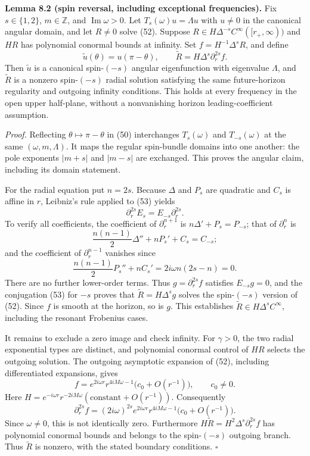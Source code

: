 \documentclass[
  10pt,
  a4paper,
]{article}
\begin{document}
\textbf{Lemma 8.2 (spin reversal, including exceptional frequencies).}
Fix \(s\in\{1,2\}\), \(m\in\mathbb Z\), and
\(\operatorname{Im}\omega>0\). Let \(T_s(\omega)u=\Lambda u\) with
\(u\ne0\) in the canonical angular domain, and let \(R\ne0\) solve (52).
Suppose \(R\in H\Delta^{-s}C^\infty([r_+,\infty))\) and \(HR\) has
polynomial conormal bounds at infinity. Set \(f=H^{-1}\Delta^sR\), and
define \[
 \widetilde u(\theta)=u(\pi-\theta),\qquad
 \widetilde R=H\Delta^s\partial_r^{2s}f.
 \tag{55}
\] Then \(\widetilde u\) is a canonical spin-\((-s)\) angular
eigenfunction with eigenvalue \(\Lambda\), and \(\widetilde R\) is a
nonzero spin-\((-s)\) radial solution satisfying the same future-horizon
regularity and outgoing infinity conditions. This holds at every
frequency in the open upper half-plane, without a nonvanishing horizon
leading-coefficient assumption.

\emph{Proof.} Reflecting \(\theta\mapsto\pi-\theta\) in (50)
interchanges \(T_s(\omega)\) and \(T_{-s}(\omega)\) at the same
\((\omega,m,\Lambda)\). It maps the regular spin-bundle domains into one
another: the pole exponents \(|m+s|\) and \(|m-s|\) are exchanged. This
proves the angular claim, including its domain statement.

For the radial equation put \(n=2s\). Because \(\Delta\) and \(P_s\) are
quadratic and \(C_s\) is affine in \(r\), Leibniz's rule applied to (53)
yields \[
 \boxed{\quad\partial_r^{2s}E_s
 = E_{-s}\partial_r^{2s}.\quad}
 \tag{56}
\] To verify all coefficients, the coefficient of \(\partial_r^{n+1}\)
is \(n\Delta'+P_s=P_{-s}\); that of \(\partial_r^n\) is \[
 \frac{n(n-1)}2\Delta''+nP_s'+C_s=C_{-s};
\] and the coefficient of \(\partial_r^{n-1}\) vanishes since \[
 \frac{n(n-1)}2P_s''+nC_s'
 =2i\omega n(2s-n)=0.
\] There are no further lower-order terms. Thus \(g=\partial_r^{2s}f\)
satisfies \(E_{-s}g=0\), and the conjugation (53) for \(-s\) proves that
\(\widetilde R=H\Delta^sg\) solves the spin-\((-s)\) version of (52).
Since \(f\) is smooth at the horizon, so is \(g\). This establishes
\(\widetilde R\in H\Delta^sC^\infty\), including the resonant Frobenius
cases.

It remains to exclude a zero image and check infinity. For \(\gamma>0\),
the two radial exponential types are distinct, and polynomial conormal
control of \(HR\) selects the outgoing solution. The outgoing asymptotic
expansion of (52), including differentiated expansions, gives \[
 f=e^{2i\omega r}r^{4iM\omega-1}
       \bigl(c_0+O(r^{-1})\bigr),\qquad c_0\ne0.
 \tag{57}
\] Here \(H=e^{-i\omega r}r^{-2iM\omega}
(\text{constant}+O(r^{-1}))\). Consequently \[
 \partial_r^{2s}f=(2i\omega)^{2s}
 e^{2i\omega r}r^{4iM\omega-1}
       \bigl(c_0+O(r^{-1})\bigr).
 \tag{58}
\] Since \(\omega\ne0\), this is not identically zero. Furthermore
\(H\widetilde R=H^2\Delta^s\partial_r^{2s}f\) has polynomial conormal
bounds and belongs to the spin-\((-s)\) outgoing branch. Thus
\(\widetilde R\) is nonzero, with the stated boundary conditions.
\(\square\)
\end{document}
